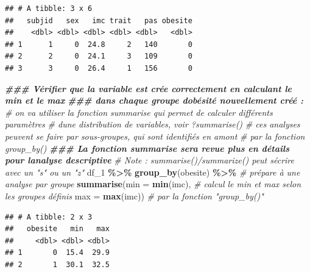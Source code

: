 \documentclass[
]{book}
\newenvironment{Shaded}{\begin{snugshade}}{\end{snugshade}}
\newcommand{\AttributeTok}[1]{\textcolor[rgb]{0.13,0.29,0.53}{#1}}
\newcommand{\CommentTok}[1]{\textcolor[rgb]{0.56,0.35,0.01}{\textit{#1}}}
\newcommand{\DocumentationTok}[1]{\textcolor[rgb]{0.56,0.35,0.01}{\textbf{\textit{#1}}}}
\newcommand{\FunctionTok}[1]{\textcolor[rgb]{0.13,0.29,0.53}{\textbf{#1}}}
\newcommand{\NormalTok}[1]{#1}
\newcommand{\SpecialCharTok}[1]{\textcolor[rgb]{0.81,0.36,0.00}{\textbf{#1}}}
\begin{document}
\begin{verbatim}
## # A tibble: 3 x 6
##   subjid   sex   imc trait   pas obesite
##    <dbl> <dbl> <dbl> <dbl> <dbl>   <dbl>
## 1      1     0  24.8     2   140       0
## 2      2     0  24.1     3   109       0
## 3      3     0  26.4     1   156       0
\end{verbatim}

\begin{Shaded}
\begin{Highlighting}[]
\DocumentationTok{\#\#\# Vérifier que la variable est crée correctement en calculant le min et le max}
\DocumentationTok{\#\#\# dans chaque groupe d\textquotesingle{}obésité nouvellement créé :}
\CommentTok{\# on va utiliser la fonction summarise qui permet de calculer différents paramètres}
\CommentTok{\# d\textquotesingle{}une distribution de variables, voir ?summarise()}
\CommentTok{\# ces analyses peuvent se faire par sous{-}groupes, qui sont identifiés en amont }
\CommentTok{\# par la fonction group\_by()}
\DocumentationTok{\#\#\# La fonction summarise sera revue plus en détails pour l\textquotesingle{}analyse descriptive}
\CommentTok{\# Note : summarise()/summarize() peut s\textquotesingle{}écrire avec un "s" ou un "z"}
\NormalTok{df\_1 }\SpecialCharTok{\%\textgreater{}\%}
  \FunctionTok{group\_by}\NormalTok{(obesite) }\SpecialCharTok{\%\textgreater{}\%} \CommentTok{\# prépare à une analyse par groupe}
  \FunctionTok{summarise}\NormalTok{(}\AttributeTok{min =} \FunctionTok{min}\NormalTok{(imc), }\CommentTok{\# calcul le min et max selon les groupes définis}
            \AttributeTok{max =} \FunctionTok{max}\NormalTok{(imc)) }\CommentTok{\# par la fonction "group\_by()"}
\end{Highlighting}
\end{Shaded}

\begin{verbatim}
## # A tibble: 2 x 3
##   obesite   min   max
##     <dbl> <dbl> <dbl>
## 1       0  15.4  29.9
## 2       1  30.1  32.5
\end{verbatim}
\end{document}
